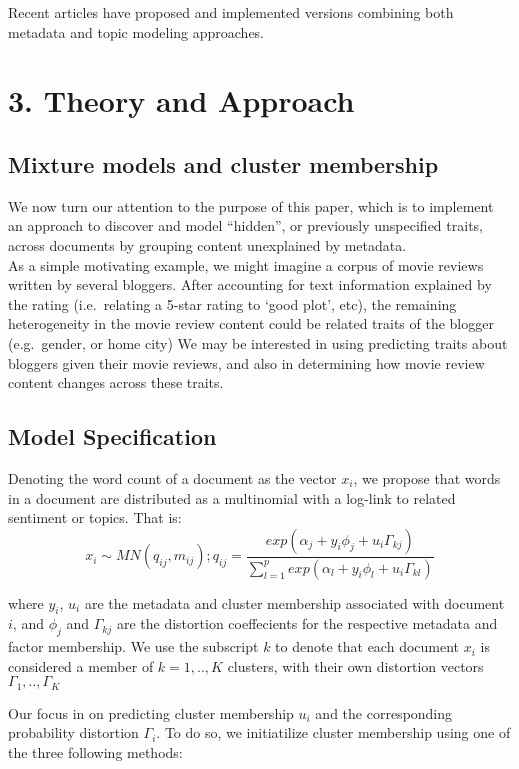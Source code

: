 \documentclass[12pt]{article}
\begin{document}
Recent articles have proposed and implemented versions combining both
metadata and topic modeling approaches.

\section{3. Theory and Approach}\label{theory-and-approach}

\subsection{Mixture models and cluster
membership}\label{mixture-models-and-cluster-membership}

We now turn our attention to the purpose of this paper, which is to
implement an approach to discover and model ``hidden'', or previously
unspecified traits, across documents by grouping content unexplained by
metadata.\\As a simple motivating example, we might imagine a corpus of
movie reviews written by several bloggers. After accounting for text
information explained by the rating (i.e.~relating a 5-star rating to
`good plot', etc), the remaining heterogeneity in the movie review
content could be related traits of the blogger (e.g.~gender, or home
city) We may be interested in using predicting traits about bloggers
given their movie reviews, and also in determining how movie review
content changes across these traits.

\subsection{Model Specification}\label{model-specification}

Denoting the word count of a document as the vector $x_i$, we propose
that words in a document are distributed as a multinomial with a
log-link to related sentiment or topics. That is:
\[ x_{i} \sim MN(q_{ij},m_{ij}) ; q_{ij} = \frac{exp(\alpha_j + y_i \phi_j + u_i \Gamma_{kj})}{\sum_{l=1}^{p}{exp(\alpha_l+ y_i \phi_l + u_i \Gamma_{kl})}}\]

where $y_i$, $u_i$ are the metadata and cluster membership associated
with document $i$, and $\phi_j$ and $\Gamma_{kj}$ are the distortion
coeffecients for the respective metadata and factor membership. We use
the subscript $k$ to denote that each document $x_i$ is considered a
member of $k = 1,..,K$ clusters, with their own distortion vectors
$\Gamma_1,..,\Gamma_K$

Our focus in on predicting cluster membership $u_i$ and the
corresponding probability distortion $\Gamma_i$. To do so, we
initiatilize cluster membership using one of the three following
methods:
\end{document}
